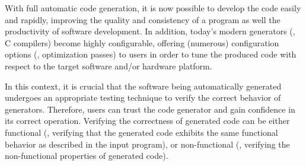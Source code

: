
 
 
With full automatic code generation, it is now possible to develop the code easily and rapidly, improving the quality and consistency of a program as well the productivity of software development\cite{kapteijns2009comparative}. 
In addition, today's modern generators (\eg, C compilers) become highly configurable, offering
(numerous) configuration options (\eg, optimization passes) to users in order to tune the produced code with respect to the target software and/or hardware platform. 


In this context, it is crucial that the software being automatically generated undergoes an appropriate testing technique to verify the correct behavior of generators. Therefore, users can trust the code generator and gain confidence in its correct operation.  
Verifying the correctness of generated code can be either functional (\eg, verifying that the generated code exhibits the same functional behavior as described in the input program), or non-functional (\eg, verifying the non-functional properties of generated code).

 
 





